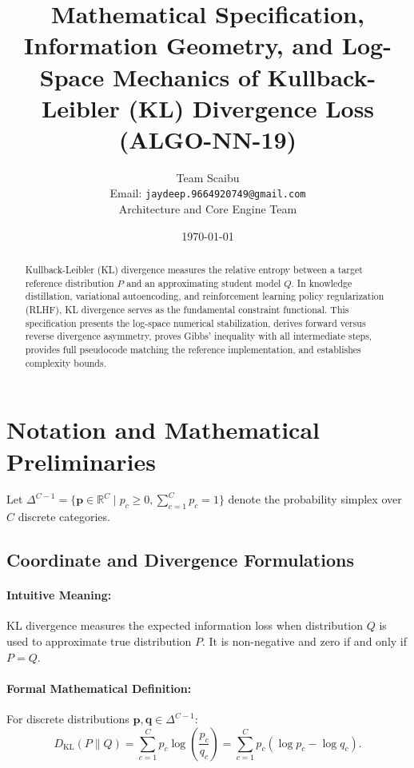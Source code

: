 \documentclass[11pt]{article}
\title{\textbf{Mathematical Specification, Information Geometry, and Log-Space Mechanics of Kullback-Leibler (KL) Divergence Loss (ALGO-NN-19)}}
\author{Team Scaibu \\ \small Email: \texttt{jaydeep.9664920749@gmail.com} \\ \small Architecture and Core Engine Team}
\date{\today}
\begin{document}
\maketitle

\begin{abstract}
Kullback-Leibler (KL) divergence measures the relative entropy between a target reference distribution $P$ and an approximating student model $Q$. In knowledge distillation, variational autoencoding, and reinforcement learning policy regularization (RLHF), KL divergence serves as the fundamental constraint functional. This specification presents the log-space numerical stabilization, derives forward versus reverse divergence asymmetry, proves Gibbs' inequality with all intermediate steps, provides full pseudocode matching the reference implementation, and establishes complexity bounds.
\end{abstract}

\section{Notation and Mathematical Preliminaries}
\label{sec:notation}

Let $\Delta^{C-1} = \{\mathbf{p} \in \mathbb{R}^C \mid p_c \ge 0, \sum_{c=1}^C p_c = 1\}$ denote the probability simplex over $C$ discrete categories.

\subsection{Coordinate and Divergence Formulations}
\paragraph{Intuitive Meaning:} KL divergence measures the expected information loss when distribution $Q$ is used to approximate true distribution $P$. It is non-negative and zero if and only if $P = Q$.

\paragraph{Formal Mathematical Definition:}
For discrete distributions $\mathbf{p}, \mathbf{q} \in \Delta^{C-1}$:
\begin{equation}
\label{eq:kl_def}
D_{\mathrm{KL}}(P \parallel Q) = \sum_{c=1}^C p_c \log\left(\frac{p_c}{q_c}\right) = \sum_{c=1}^C p_c (\log p_c - \log q_c).
\end{equation}
\end{document}
